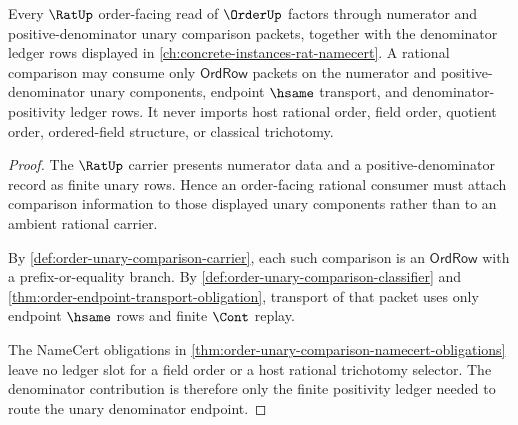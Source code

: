 \begin{theorem}
\label{thm:order-rat-consumer-boundary}
Every $\RatUp$ order-facing read of $\OrderUp$ factors through numerator and positive-denominator unary comparison packets, together with the denominator ledger rows displayed in \autoref{ch:concrete-instances-rat-namecert}. A rational comparison may consume only $\mathsf{OrdRow}$ packets on the numerator and positive-denominator unary components, endpoint $\hsame$ transport, and denominator-positivity ledger rows. It never imports host rational order, field order, quotient order, ordered-field structure, or classical trichotomy.
\end{theorem}
\begin{proof}
The $\RatUp$ carrier presents numerator data and a positive-denominator record as finite unary rows. Hence an order-facing rational consumer must attach comparison information to those displayed unary components rather than to an ambient rational carrier.

By \autoref{def:order-unary-comparison-carrier}, each such comparison is an $\mathsf{OrdRow}$ with a prefix-or-equality branch. By \autoref{def:order-unary-comparison-classifier} and \autoref{thm:order-endpoint-transport-obligation}, transport of that packet uses only endpoint $\hsame$ rows and finite $\Cont$ replay.

The NameCert obligations in \autoref{thm:order-unary-comparison-namecert-obligations} leave no ledger slot for a field order or a host rational trichotomy selector. The denominator contribution is therefore only the finite positivity ledger needed to route the unary denominator endpoint.
\end{proof}

